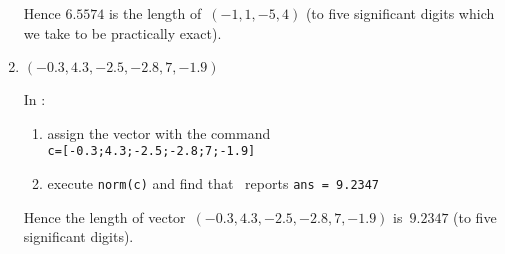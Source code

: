 \begin{example}
\begin{enumerate}
\begin{solution}
Hence \(6.5574\) is the length of~\((-1,1,-5,4)\) (to five significant digits which we take to be practically exact).
\end{solution}

\item \((-0.3,4.3,-2.5,-2.8,7,-1.9)\)
\begin{solution} 
In \script:
\begin{enumerate}
\item assign the vector with the command\\ 
\verb|c=[-0.3;4.3;-2.5;-2.8;7;-1.9]|
\item execute \verb|norm(c)| and find that \script\ reports \verb|ans = 9.2347|
\end{enumerate}
\setbox\ajrqrbox\hbox{}%
\marginpar{\usebox{\ajrqrbox\\[2ex]}}%
Hence the length of vector~\((-0.3,4.3,-2.5,-2.8,7,-1.9)\) is~\(9.2347\) (to five significant digits).
\end{solution}

\end{enumerate}
\end{example}






